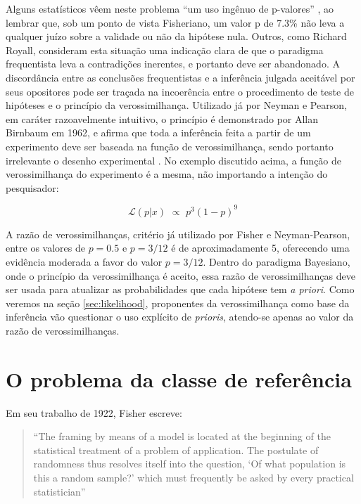 Alguns estatísticos vêem neste problema ``um uso ingênuo de p-valores'' \citep{Good92}, ao lembrar que, sob um
ponto de vista Fisheriano, um valor p de 7.3\% não leva a qualquer juízo sobre a validade ou não da hipótese nula.
Outros, como Richard Royall,
consideram esta situação uma indicação clara de que o paradigma frequentista leva a contradições inerentes, e portanto 
deve ser abandonado. A discordância entre as conclusões frequentistas e a inferência julgada aceitável por seus opositores 
pode ser traçada na incoerência entre
o procedimento de teste de hipóteses e o princípio da verossimilhança. Utilizado já por Neyman e Pearson\citep{Neyman1933},
em caráter razoavelmente intuitivo, o princípio é demonstrado por Allan Birnbaum em 1962, 
e afirma que toda a inferência feita a partir de um experimento deve ser baseada na função de verossimilhança,
sendo portanto irrelevante o desenho experimental \citep{Birnbaum62}. 
No exemplo discutido acima, a função de verossimilhança do experimento é a mesma, não importando a intenção do pesquisador:

\begin{equation}
	\mathcal{L}(p|x) \,\, \propto \,\, p^3(1-p)^9
\end{equation}

A razão de verossimilhanças, critério já utilizado por Fisher e Neyman-Pearson, entre os valores de $p=0.5$ e $p=3/12$ é de 
aproximadamente 5, oferecendo uma evidência moderada a favor do valor $p=3/12$. Dentro do paradigma Bayesiano, onde o princípio
da verossimilhança é aceito, essa razão de verossimilhanças deve ser usada para atualizar as probabilidades que cada hipótese
tem {\em a priori}. Como veremos na seção \ref{sec:likelihood}, proponentes da verossimilhança como base da inferência
vão questionar o uso explícito de {\em prioris}, atendo-se apenas ao valor da razão de verossimilhanças.

\section{O problema da classe de referência}\label{sec:classref}

Em seu trabalho de 1922, Fisher escreve:

\begin{quote}
``The framing by means of a model is located at the beginning of the
statistical treatment of a problem of application. The postulate of randomness thus resolves itself into the 
question, `Of what population is this a random sample?' which must frequently be asked by every practical
statistician''\citep{Fisher1922}
\end{quote}

